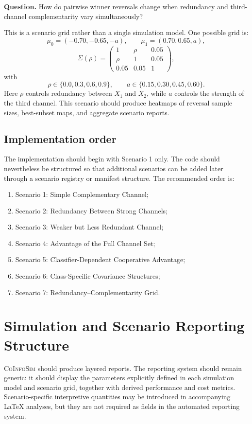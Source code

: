 \documentclass[11pt,a4paper]{article}
\newcommand{\CoInfoSim}{\textsc{CoInfoSim}}
\begin{document}
\textbf{Question.} How do pairwise winner reversals change when redundancy and third-channel complementarity vary simultaneously?

This is a scenario grid rather than a single simulation model. One possible grid is:
\[
    \mu_0=(-0.70,-0.65,-a),
    \qquad
    \mu_1=(0.70,0.65,a),
\]
\[
\Sigma(\rho)=
\begin{pmatrix}
1 & \rho & 0.05\\
\rho & 1 & 0.05\\
0.05 & 0.05 & 1
\end{pmatrix},
\]
with
\[
    \rho\in\{0.0,0.3,0.6,0.9\},
    \qquad
    a\in\{0.15,0.30,0.45,0.60\}.
\]
Here $\rho$ controls redundancy between $X_1$ and $X_2$, while $a$ controls the strength of the third channel. This scenario should produce heatmaps of reversal sample sizes, best-subset maps, and aggregate scenario reports.

\subsection{Implementation order}

The implementation should begin with Scenario 1 only. The code should nevertheless be structured so that additional scenarios can be added later through a scenario registry or manifest structure. The recommended order is:
\begin{enumerate}
    \item Scenario 1: Simple Complementary Channel;
    \item Scenario 2: Redundancy Between Strong Channels;
    \item Scenario 3: Weaker but Less Redundant Channel;
    \item Scenario 4: Advantage of the Full Channel Set;
    \item Scenario 5: Classifier-Dependent Cooperative Advantage;
    \item Scenario 6: Class-Specific Covariance Structures;
    \item Scenario 7: Redundancy--Complementarity Grid.
\end{enumerate}

\section{Simulation and Scenario Reporting Structure}

\CoInfoSim{} should produce layered reports. The reporting system should remain generic: it should display the parameters explicitly defined in each simulation model and scenario grid, together with derived performance and cost metrics. Scenario-specific interpretive quantities may be introduced in accompanying LaTeX analyses, but they are not required as fields in the automated reporting system.
\end{document}
